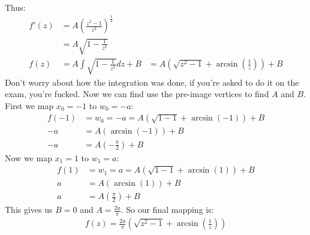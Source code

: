 \begin{example}
\begin{align}
    \end{align}
    Thus:
    \begin{align}
        f'(z) & = A\left(\frac{z^2 - 1}{z^2}\right)^{\frac{1}{2}}          \\
              & = A \sqrt{1 - \frac{1}{z^2}}                               \\
        f(z)  & = A\int \sqrt{1 - \frac{1}{z^2}}dz + B
              & = A \left(\sqrt{z^2 - 1} + \arcsin(\frac{1}{z})\right) + B
    \end{align}
    Don't worry about how the integration was done, if you're asked to do it on the exam, you're fucked. Now we can find use the pre-image vertices to find $A$ and $B$. First we map $x_0 = -1$ to $w_0 = -a$:
    \begin{align}
        f(-1) & = w_0 = -a = A \left(\sqrt{1 - 1} + \arcsin(-1)\right) + B \\
        -a    & = A \left(\arcsin(-1)\right) + B                           \\
        -a    & = A \left(-\frac{\pi}{2}\right) + B
    \end{align}
    Now we map $x_1 = 1$ to $w_1 = a$:
    \begin{align}
        f(1) & = w_1 = a = A \left(\sqrt{1 - 1} + \arcsin(1)\right) + B \\
        a    & = A \left(\arcsin(1)\right) + B                          \\
        a    & = A \left(\frac{\pi}{2}\right) + B
    \end{align}
    This gives us $B = 0$ and $A = \frac{2a}{\pi}$. So our final mapping is:
    \begin{align}
        f(z) = \frac{2a}{\pi} \left(\sqrt{z^2 - 1} + \arcsin(\frac{1}{z})\right)
    \end{align}
\end{example}

